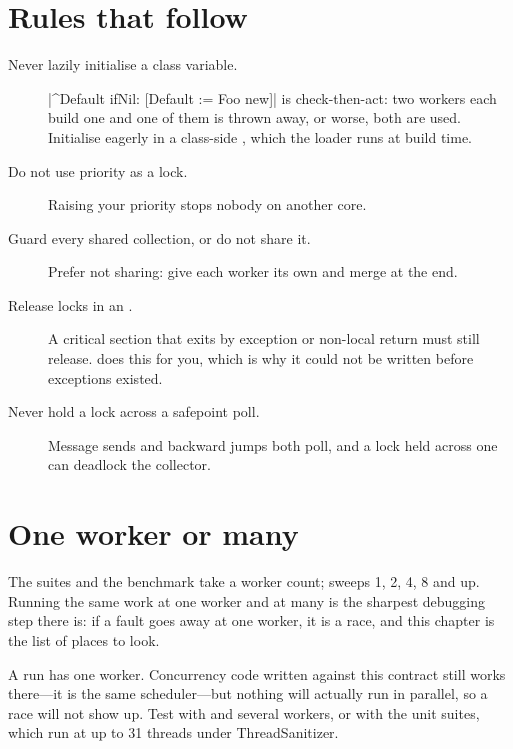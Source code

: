 \section{Rules that follow}

\begin{description}
\item[Never lazily initialise a class variable.]
  \ct|^Default ifNil: [Default := Foo new]| is check-then-act: two workers
  each build one and one of them is thrown away, or worse, both are used.
  Initialise eagerly in a class-side , which the loader runs at
  build time.
\item[Do not use priority as a lock.] Raising your priority stops nobody on
  another core.
\item[Guard every shared collection, or do not share it.] Prefer not sharing:
  give each worker its own and merge at the end.
\item[Release locks in an .] A critical section that exits by
  exception or non-local return must still release.  does this for
  you, which is why it could not be written before exceptions existed.
\item[Never hold a lock across a safepoint poll.] Message sends and backward
  jumps both poll, and a lock held across one can deadlock the collector.
\end{description}

\section{One worker or many}

The suites and the benchmark take a worker count;  sweeps 1, 2,
4, 8 and up. Running the same work at one worker and at many is the sharpest
debugging step there is: if a fault goes away at one worker, it is a race, and
this chapter is the list of places to look.

\begin{stnote}
A  run has one worker. Concurrency code written against
this contract still works there---it is the same scheduler---but nothing will
actually run in parallel, so a race will not show up. Test with  and
several workers, or with the unit suites, which run at up to 31 threads under
ThreadSanitizer.
\end{stnote}
